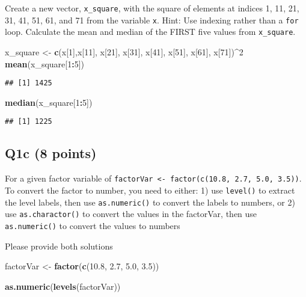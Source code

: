\documentclass[
]{article}
\newenvironment{Shaded}{\begin{snugshade}}{\end{snugshade}}
\newcommand{\DecValTok}[1]{\textcolor[rgb]{0.00,0.00,0.81}{#1}}
\newcommand{\FloatTok}[1]{\textcolor[rgb]{0.00,0.00,0.81}{#1}}
\newcommand{\FunctionTok}[1]{\textcolor[rgb]{0.13,0.29,0.53}{\textbf{#1}}}
\newcommand{\NormalTok}[1]{#1}
\newcommand{\OtherTok}[1]{\textcolor[rgb]{0.56,0.35,0.01}{#1}}
\newcommand{\SpecialCharTok}[1]{\textcolor[rgb]{0.81,0.36,0.00}{\textbf{#1}}}
\begin{document}
Create a new vector, \texttt{x\_square}, with the square of elements at
indices 1, 11, 21, 31, 41, 51, 61, and 71 from the variable \texttt{x}.
Hint: Use indexing rather than a \texttt{for} loop. Calculate the mean
and median of the FIRST five values from \texttt{x\_square}.

\begin{Shaded}
\begin{Highlighting}[]
\NormalTok{x\_square }\OtherTok{\textless{}{-}} \FunctionTok{c}\NormalTok{(x[}\DecValTok{1}\NormalTok{],x[}\DecValTok{11}\NormalTok{], x[}\DecValTok{21}\NormalTok{], x[}\DecValTok{31}\NormalTok{], x[}\DecValTok{41}\NormalTok{], x[}\DecValTok{51}\NormalTok{], x[}\DecValTok{61}\NormalTok{], x[}\DecValTok{71}\NormalTok{])}\SpecialCharTok{\^{}}\DecValTok{2}
\FunctionTok{mean}\NormalTok{(x\_square[}\DecValTok{1}\SpecialCharTok{:}\DecValTok{5}\NormalTok{])}
\end{Highlighting}
\end{Shaded}

\begin{verbatim}
## [1] 1425
\end{verbatim}

\begin{Shaded}
\begin{Highlighting}[]
\FunctionTok{median}\NormalTok{(x\_square[}\DecValTok{1}\SpecialCharTok{:}\DecValTok{5}\NormalTok{])}
\end{Highlighting}
\end{Shaded}

\begin{verbatim}
## [1] 1225
\end{verbatim}

\hypertarget{q1c-8-points}{%
\subsection{Q1c (8 points)}\label{q1c-8-points}}

For a given factor variable of
\texttt{factorVar\ \textless{}-\ factor(c(10.8,\ 2.7,\ 5.0,\ 3.5))}. To
convert the factor to number, you need to either: 1) use
\texttt{level()} to extract the level labels, then use
\texttt{as.numeric()} to convert the labels to numbers, or 2) use
\texttt{as.charactor()} to convert the values in the factorVar, then use
\texttt{as.numeric()} to convert the values to numbers

Please provide both solutions

\begin{Shaded}
\begin{Highlighting}[]
\NormalTok{factorVar }\OtherTok{\textless{}{-}} \FunctionTok{factor}\NormalTok{(}\FunctionTok{c}\NormalTok{(}\FloatTok{10.8}\NormalTok{, }\FloatTok{2.7}\NormalTok{, }\FloatTok{5.0}\NormalTok{, }\FloatTok{3.5}\NormalTok{))}

\FunctionTok{as.numeric}\NormalTok{(}\FunctionTok{levels}\NormalTok{(factorVar))}
\end{Highlighting}
\end{Shaded}
\end{document}
